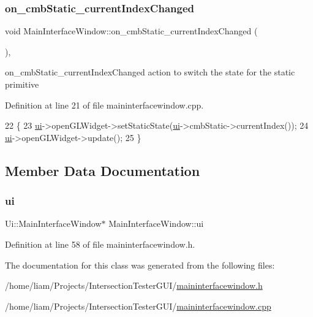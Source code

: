 \subsubsection{\texorpdfstring{on\+\_\+cmb\+Static\+\_\+current\+Index\+Changed}{on\_cmbStatic\_currentIndexChanged}}
{\footnotesize\ttfamily void Main\+Interface\+Window\+::on\+\_\+cmb\+Static\+\_\+current\+Index\+Changed (\begin{DoxyParamCaption}{ }\end{DoxyParamCaption})\hspace{0.3cm}{\ttfamily [private]}, {\ttfamily [slot]}}



on\+\_\+cmb\+Static\+\_\+current\+Index\+Changed action to switch the state for the static primitive 



Definition at line 21 of file maininterfacewindow.\+cpp.


\begin{DoxyCode}
22 \{
23     \hyperlink{class_main_interface_window_afe3aae95d697ade063b0e4ad517655b9}{ui}->openGLWidget->setStaticState(\hyperlink{class_main_interface_window_afe3aae95d697ade063b0e4ad517655b9}{ui}->cmbStatic->currentIndex());
24     \hyperlink{class_main_interface_window_afe3aae95d697ade063b0e4ad517655b9}{ui}->openGLWidget->update();
25 \}
\end{DoxyCode}


\subsection{Member Data Documentation}
\mbox{\label{class_main_interface_window_afe3aae95d697ade063b0e4ad517655b9}} 
\subsubsection{\texorpdfstring{ui}{ui}}
{\footnotesize\ttfamily Ui\+::\+Main\+Interface\+Window$\ast$ Main\+Interface\+Window\+::ui\hspace{0.3cm}{\ttfamily [private]}}



Definition at line 58 of file maininterfacewindow.\+h.



The documentation for this class was generated from the following files\+:\begin{DoxyCompactItemize}
\item 
/home/liam/\+Projects/\+Intersection\+Tester\+G\+U\+I/\hyperlink{maininterfacewindow_8h}{maininterfacewindow.\+h}\item 
/home/liam/\+Projects/\+Intersection\+Tester\+G\+U\+I/\hyperlink{maininterfacewindow_8cpp}{maininterfacewindow.\+cpp}\end{DoxyCompactItemize}

